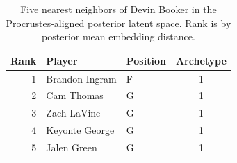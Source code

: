 \begin{table}[htbp]
  \centering\small
  \begin{tabular}{rllc}
    \toprule
    Rank & Player & Position & Archetype \\
    \midrule
    1 & Brandon Ingram & F & 1 \\
    2 & Cam Thomas & G & 1 \\
    3 & Zach LaVine & G & 1 \\
    4 & Keyonte George & G & 1 \\
    5 & Jalen Green & G & 1 \\
    \bottomrule
  \end{tabular}
  \caption{Five nearest neighbors of Devin Booker in the Procrustes-aligned posterior latent space. Rank is by posterior mean embedding distance.}
  \label{tab:Devin_Booker_neighbors}
\end{table}

